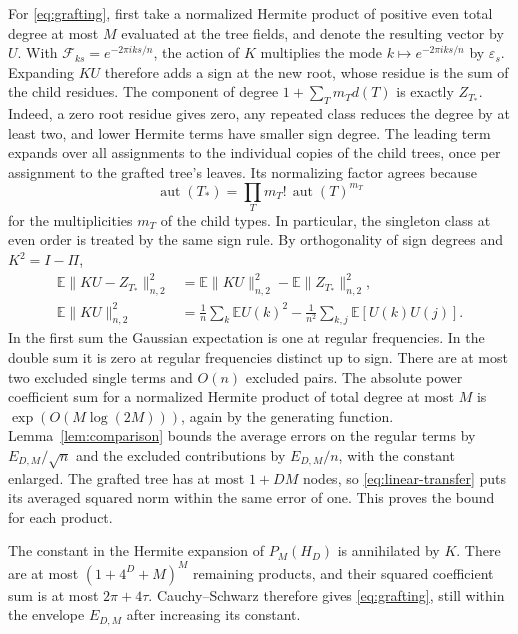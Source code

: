 \documentclass[preprints,article,submit,oneauthor]{Definitions/mdpi}
\newcommand{\E}{\mathbb E}
\newcommand{\aut}{\operatorname{aut}}
\newcommand{\norm}[1]{\lVert #1\rVert}
\begin{document}
For \eqref{eq:grafting}, first take a normalized Hermite product
of positive even total degree at most \(M\) evaluated at the tree
fields, and denote the resulting vector by \(U\). With
\(\mathcal F_{ks}=e^{-2\pi i ks/n}\), the action of \(K\) multiplies the
mode \(k\mapsto e^{-2\pi i ks/n}\) by \(\varepsilon_s\). Expanding
\(K U\) therefore adds a sign at the new root, whose residue is the
sum of the child residues. The component of degree
\(1+\sum_T m_T d(T)\) is exactly \(Z_{T_*}\). Indeed, a zero root
residue gives zero, any repeated class reduces the degree by at
least two, and lower Hermite terms have smaller sign degree. The
leading term expands over all assignments to the individual copies
of the child trees, once per assignment to the grafted tree's
leaves. Its normalizing factor agrees because
\[
 \aut(T_*)=\prod_T m_T!\,\aut(T)^{m_T}
\]
for the multiplicities \(m_T\) of the child types. In particular, the
singleton class at even order is treated by the same sign rule.
By orthogonality of sign degrees and \(K^2=I-\Pi\),
\begin{align*}
 \E\norm{K U-Z_{T_*}}_{n,2}^2
   &= \E\norm{K U}_{n,2}^2-\E\norm{Z_{T_*}}_{n,2}^2,\\
 \E\norm{K U}_{n,2}^2
   &= \frac1n\sum_k\E U(k)^2-\frac1{n^2}\sum_{k,j}\E[U(k)U(j)].
\end{align*}
In the first sum the Gaussian expectation is one at regular
frequencies. In the double sum it is zero at regular frequencies
distinct up to sign. There are at most two excluded single terms
and \(O(n)\) excluded pairs. The absolute
power coefficient sum for a normalized Hermite product of total
degree at most \(M\) is \(\exp(O(M\log(2M)))\), again by the generating
function. Lemma~\ref{lem:comparison} bounds the average errors on
the regular terms by \(E_{D,M}/\sqrt n\) and the excluded
contributions by \(E_{D,M}/n\), with the constant enlarged.
The grafted tree has
at most \(1+DM\) nodes, so \eqref{eq:linear-transfer} puts its averaged
squared norm within the same error of one. This proves the bound
for each product.

The constant in the Hermite expansion of \(P_M(H_D)\) is annihilated by
\(K\). There are at most \((1+4^D+M)^M\) remaining products, and their
squared coefficient sum is at most \(2\pi+4\tau\). Cauchy--Schwarz
therefore gives \eqref{eq:grafting}, still within the envelope
\(E_{D,M}\) after increasing its constant.
\end{document}
